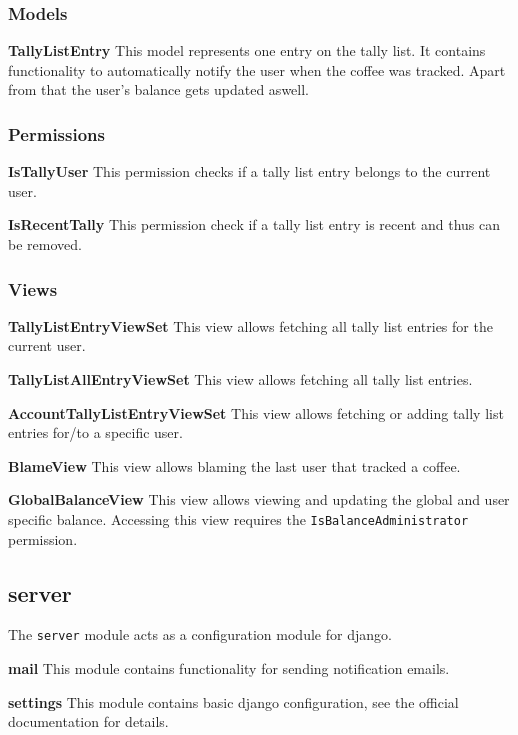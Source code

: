 \subsubsection{Models}\label{models-4}

\textbf{TallyListEntry} This model represents one entry on the tally
list. It contains functionality to automatically notify the user when
the coffee was tracked. Apart from that the user's balance gets updated
aswell.

\subsubsection{Permissions}\label{permissions-2}

\textbf{IsTallyUser} This permission checks if a tally list entry
belongs to the current user.

\textbf{IsRecentTally} This permission check if a tally list entry is
recent and thus can be removed.

\subsubsection{Views}\label{views-5}

\textbf{TallyListEntryViewSet} This view allows fetching all tally list
entries for the current user.

\textbf{TallyListAllEntryViewSet} This view allows fetching all tally
list entries.

\textbf{AccountTallyListEntryViewSet} This view allows fetching or
adding tally list entries for/to a specific user.

\textbf{BlameView} This view allows blaming the last user that tracked a
coffee.

\textbf{GlobalBalanceView} This view allows viewing and updating the
global and user specific balance. Accessing this view requires the
\texttt{IsBalanceAdministrator} permission.

\subsection{server}\label{server}

The \texttt{server} module acts as a configuration module for django.

\textbf{mail} This module contains functionality for sending
notification emails.

\textbf{settings} This module contains basic django configuration, see
the official documentation for details.

